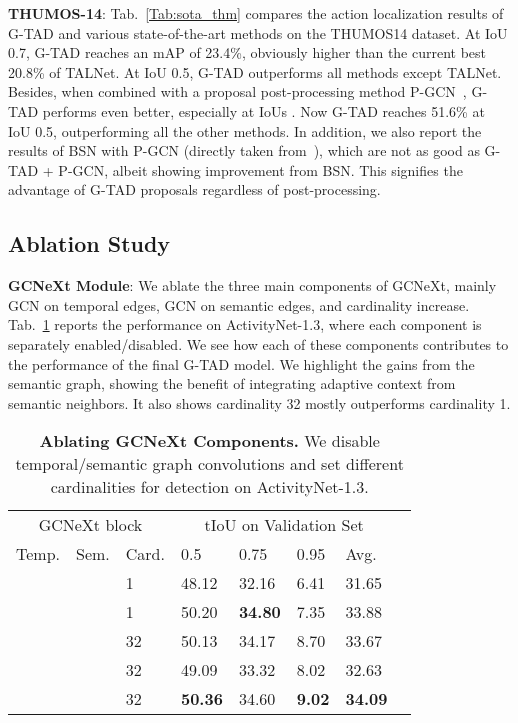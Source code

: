 \documentclass[10pt,twocolumn,letterpaper]{article}
\newcommand{\cmark}{\ding{51}}\newcommand{\xmark}{\ding{55}}
\begin{document}
\noindent
{\bf THUMOS-14}: Tab.~\ref{Tab:sota_thm} compares the action localization results of G-TAD and various state-of-the-art methods on the THUMOS14 dataset. At IoU 0.7, G-TAD reaches an mAP of
23.4\%, obviously higher than the current best 20.8\% of TALNet. At IoU 0.5, G-TAD outperforms all methods except TALNet.
Besides, when combined with a proposal post-processing method P-GCN~\cite{zeng2019graph}, G-TAD performs even better, especially at IoUs . Now G-TAD reaches 51.6\% at IoU 0.5, outperforming all the other methods. In addition, we also report the results of BSN with P-GCN (directly taken from~\cite{zeng2019graph}), which are not as good as G-TAD + P-GCN, albeit showing improvement from BSN. This signifies the advantage of G-TAD proposals regardless of post-processing. 






\subsection{Ablation Study} \label{subsec:abl}

\noindent
\textbf{GCNeXt Module}: We ablate the three main components of GCNeXt, mainly GCN on temporal edges, GCN on semantic edges, and cardinality increase. 
Tab.~\ref{tab:abl_gcnext} reports the performance on ActivityNet-1.3, where each component is separately enabled/disabled. We see how each of these components contributes to the performance of the final G-TAD model. We highlight the gains from the semantic graph, showing the benefit of integrating adaptive context from semantic neighbors. It also shows cardinality 32 mostly outperforms cardinality 1.


\begin{table}[tbp]
\centering
\caption{\textbf{Ablating GCNeXt Components.} We disable temporal/semantic graph convolutions and set different cardinalities for detection on ActivityNet-1.3.   }
\small
\begin{tabular}{p{0.7cm}<{\centering}p{0.7cm}<{\centering}p{0.7cm}<{\centering}|p{0.65cm}<{\centering}p{0.65cm}<{\centering}p{0.65cm}<{\centering}p{0.55cm}<{\centering}p{0.65cm}<{\centering}}
\hline
\multicolumn{3}{c|}{ GCNeXt block} & \multicolumn{4}{c}{tIoU on Validation Set}\\
Temp. & Sem.  & Card.  & 0.5  &  0.75  & 0.95  & Avg. \\
\hline
\xmark & \xmark & 1 & {48.12} & {32.16} & 6.41 & {31.65} \\ \hline
\cmark & \cmark & 1 & {50.20} & \textbf{34.80} & 7.35 & {33.88} \\
\cmark & \xmark & 32& {50.13} & {34.17} & {8.70} & {33.67} \\
\xmark & \cmark & 32& {49.09} & {33.32} & 8.02 & {32.63} \\ \hline
\cmark & \cmark & 32& {\textbf{50.36}} & {{34.60}} & \textbf{9.02} & {\textbf{34.09}} \\
\hline
\end{tabular}
\label{tab:abl_gcnext}
\end{table}
\end{document}
